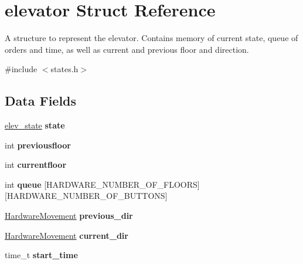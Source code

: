 \hypertarget{structelevator}{}\section{elevator Struct Reference}
\label{structelevator}


A structure to represent the elevator. Contains memory of current state, queue of orders and time, as well as current and previous floor and direction.  




{\ttfamily \#include $<$states.\+h$>$}

\subsection*{Data Fields}
\begin{DoxyCompactItemize}
\item 
\mbox{\label{structelevator_acb09243d4d09143920731df452b1ed02}} 
\hyperlink{states_8h_a09fd0473240586cf26c56b9c75589073}{elev\+\_\+state} {\bfseries state}
\item 
\mbox{\label{structelevator_ae311bf8256d89166baf4a0017507ae5c}} 
int {\bfseries previousfloor}
\item 
\mbox{\label{structelevator_a24496bfa1eacfdec1475e3ae3e6e73f5}} 
int {\bfseries currentfloor}
\item 
\mbox{\label{structelevator_aaf598f7465fc2e79630d9127ef6c8683}} 
int {\bfseries queue} \mbox{[}H\+A\+R\+D\+W\+A\+R\+E\+\_\+\+N\+U\+M\+B\+E\+R\+\_\+\+O\+F\+\_\+\+F\+L\+O\+O\+RS\mbox{]}\mbox{[}H\+A\+R\+D\+W\+A\+R\+E\+\_\+\+N\+U\+M\+B\+E\+R\+\_\+\+O\+F\+\_\+\+B\+U\+T\+T\+O\+NS\mbox{]}
\item 
\mbox{\label{structelevator_a98f9e9d9e81effe445ff82d8e86a60c5}} 
\hyperlink{hardware_8h_a2167c399a24df296afc432bcb88228af}{Hardware\+Movement} {\bfseries previous\+\_\+dir}
\item 
\mbox{\label{structelevator_a5bd0a30b0bb1258fac8e6ffeef258338}} 
\hyperlink{hardware_8h_a2167c399a24df296afc432bcb88228af}{Hardware\+Movement} {\bfseries current\+\_\+dir}
\item 
\mbox{\label{structelevator_af0715c7b366082e0edbe4dd8f7d755a0}} 
time\+\_\+t {\bfseries start\+\_\+time}
\end{DoxyCompactItemize}


